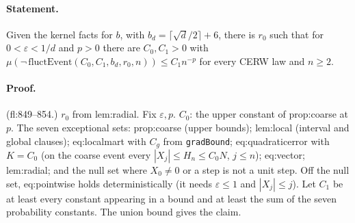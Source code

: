 \paragraph{Statement.} Given the kernel facts for $b$, with $b_d=\lceil\sqrt d/2\rceil+6$, there is $r_0$ such that for $0<\varepsilon<1/d$ and $p>0$ there are $C_0,C_1>0$ with
$\mu(\neg\,\mathrm{fluctEvent}(C_0,C_1,b_d,r_0,n))\leq C_1n^{-p}$ for every CERW law and $n\geq2$.
\paragraph{Proof.} (fl:849--854.) $r_0$ from lem:radial. Fix $\varepsilon,p$. $C_0$: the upper constant of prop:coarse at $p$. The seven exceptional sets:
prop:coarse (upper bounds); lem:local (interval and global clauses); eq:localmart with $C_g$ from \texttt{gradBound}; eq:quadraticerror with $K=C_0$
(on the coarse event every $|X_j|\leq H_n\leq C_0N$, $j\leq n$); eq:vector; lem:radial; and the null set where $X_0\neq0$ or a step is not a unit step.
Off the null set, eq:pointwise holds deterministically (it needs $\varepsilon\leq1$ and $|X_j|\leq j$). Let $C_1$ be at least every constant appearing in a bound
and at least the sum of the seven probability constants. The union bound gives the claim.
